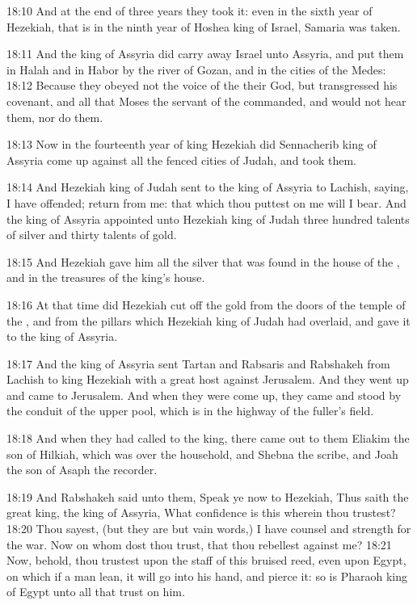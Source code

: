 18:10 And at the end of three years they took it: even in the sixth year of Hezekiah, that is in the ninth year of Hoshea king of Israel, Samaria was taken.

18:11 And the king of Assyria did carry away Israel unto Assyria, and put them in Halah and in Habor by the river of Gozan, and in the cities of the Medes: 18:12 Because they obeyed not the voice of the \LORD their God, but transgressed his covenant, and all that Moses the servant of the \LORD commanded, and would not hear them, nor do them.

18:13 Now in the fourteenth year of king Hezekiah did Sennacherib king of Assyria come up against all the fenced cities of Judah, and took them.

18:14 And Hezekiah king of Judah sent to the king of Assyria to Lachish, saying, I have offended; return from me: that which thou puttest on me will I bear. And the king of Assyria appointed unto Hezekiah king of Judah three hundred talents of silver and thirty talents of gold.

18:15 And Hezekiah gave him all the silver that was found in the house of the \LORD, and in the treasures of the king's house.

18:16 At that time did Hezekiah cut off the gold from the doors of the temple of the \LORD, and from the pillars which Hezekiah king of Judah had overlaid, and gave it to the king of Assyria.

18:17 And the king of Assyria sent Tartan and Rabsaris and Rabshakeh from Lachish to king Hezekiah with a great host against Jerusalem. And they went up and came to Jerusalem. And when they were come up, they came and stood by the conduit of the upper pool, which is in the highway of the fuller's field.

18:18 And when they had called to the king, there came out to them Eliakim the son of Hilkiah, which was over the household, and Shebna the scribe, and Joah the son of Asaph the recorder.

18:19 And Rabshakeh said unto them, Speak ye now to Hezekiah, Thus saith the great king, the king of Assyria, What confidence is this wherein thou trustest?  18:20 Thou sayest, (but they are but vain words,) I have counsel and strength for the war. Now on whom dost thou trust, that thou rebellest against me?  18:21 Now, behold, thou trustest upon the staff of this bruised reed, even upon Egypt, on which if a man lean, it will go into his hand, and pierce it: so is Pharaoh king of Egypt unto all that trust on him.

